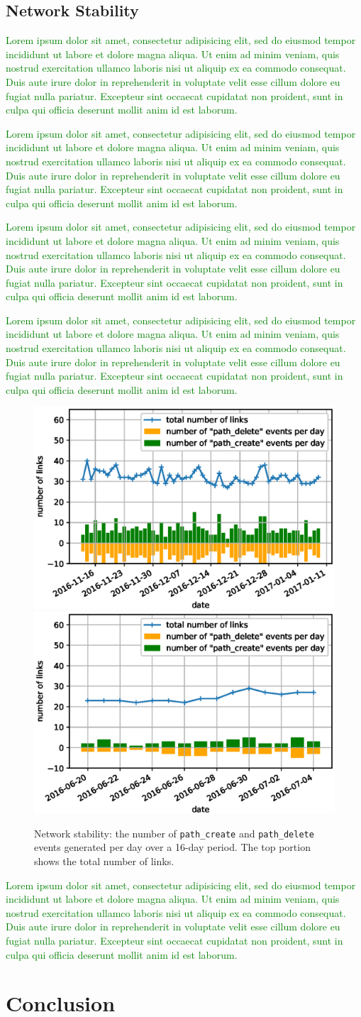 \documentclass{elsarticle}
\newcommand{\lorem}          {\textcolor{green}{Lorem ipsum dolor sit amet, consectetur adipisicing elit, sed do eiusmod tempor incididunt ut labore et dolore magna aliqua. Ut enim ad minim veniam, quis nostrud exercitation ullamco laboris nisi ut aliquip ex ea commodo consequat. Duis aute irure dolor in reprehenderit in voluptate velit esse cillum dolore eu fugiat nulla pariatur. Excepteur sint occaecat cupidatat non proident, sunt in culpa qui officia deserunt mollit anim id est laborum.}}
\newcommand{\pathcreate}          {{\tt path\_create}\xspace}
\newcommand{\pathdelete}          {{\tt path\_delete}\xspace}
\begin{document}
\subsection{Network Stability}
\label{sec:net_stability}


\lorem


\lorem


\lorem


\lorem

\begin{figure}
    \includegraphics[width=0.5\columnwidth]{net_churn.eps}
    \includegraphics[width=0.5\columnwidth]{net_churn_peach.eps}
    \caption{
        Network stability: the number of \pathcreate and \pathdelete events generated per day over a 16-day period.
        The top portion shows the total number of links.
    }
    \label{fig:net_churn}
\end{figure}


\lorem

\section{Conclusion}
\label{sec:conclusion}

\end{document}
